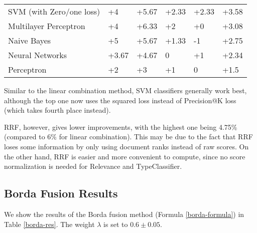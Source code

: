 \begin{table}[h!]
{\begin{tabular}{@{}llllll@{}}
SVM (with Zero/one loss)                       	& +4                       & +5.67                       & +2.33                    & +2.33                       & +3.58             \\
Multilayer Perceptron				& +4 			   & +6.33 			 & +2 			    & +0 			  & +3.08 \\
Naive Bayes                                    	& +5                       & +5.67                       & +1.33                    & -1                          & +2.75             \\
Neural Networks                              	& +3.67                    & +4.67                       & 0                        & +1                          & +2.34             \\
Perceptron                                     	& +2                       & +3                          & +1                       & 0                           & +1.5              \\ \bottomrule
\end{tabular}%
}
\end{table}

Similar to the linear combination method, SVM classifiers generally work best,
although the top one now uses the squared loss instead of Precision@K loss (which takes fourth place instead).

RRF, however, gives lower improvements, with the highest one being 4.75\%
(compared to 6\% for linear combination).
This may be due to the fact that RRF loses some information by only using document ranks instead of raw scores. On the other hand, RRF
is easier and more convenient to compute, since no score normalization is needed for \textsf{Relevance} and \textsf{TypeClassifier}.


\subsection{Borda Fusion Results}
We show the results of the Borda fusion method (Formula \ref{borda-formula}) in Table \ref{borda-res}.
The weight $\lambda$ is set to $0.6\pm 0.05$.

